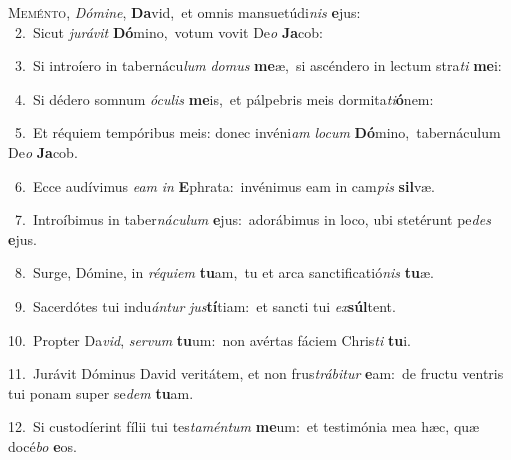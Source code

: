 \lettrine{\initial\textcolor{\initialcolor}{M}}{eménto,} \textit{Dó}\-\textit{mi}\textit{ne}, \textbf{Da}\-vid,~\star et omnis mansuetúdi\textit{nis} \textbf{e}\-jus:\\
{\numbfont\textcolor{\numbcolor}{~2.}}~Sicut \textit{ju}\-\textit{rá}\textit{vit} \textbf{Dó}\-mino,~\star votum vovit De\textit{o} \textbf{Ja}\-cob:\par
{\numbfont\textcolor{\numbcolor}{~3.}}~Si introíero in tabernácu\textit{lum} \textit{do}\-\textit{mus} \textbf{me}\-æ,~\star si ascéndero in lectum stra\textit{ti} \textbf{me}\-i:\par
{\numbfont\textcolor{\numbcolor}{~4.}}~Si dédero somnum \textit{ó}\-\textit{cu}\textit{lis} \textbf{me}\-is,~\star et pálpebris meis dormita\-\textit{ti}\-\textbf{ó}nem:\par
{\numbfont\textcolor{\numbcolor}{~5.}}~Et réquiem tempóribus meis: donec invéni\textit{am} \textit{lo}\-\textit{cum} \textbf{Dó}\-mino,~\star tabernáculum De\textit{o} \textbf{Ja}\-cob.\par
{\numbfont\textcolor{\numbcolor}{~6.}}~Ecce audívimus \textit{e}\-\textit{am} \textit{in} \textbf{E}\-phrata:~\star invénimus eam in cam\textit{pis} \textbf{sil}\-væ.\par
{\numbfont\textcolor{\numbcolor}{~7.}}~Introíbimus in taber\-\textit{ná}\-\textit{cu}\textit{lum} \textbf{e}\-jus:~\star adorábimus in loco, ubi stetérunt pe\textit{des} \textbf{e}\-jus.\par
{\numbfont\textcolor{\numbcolor}{~8.}}~Surge, Dómine, in \textit{ré}\-\textit{qui}\textit{em} \textbf{tu}\-am,~\star tu et arca sanctificatió\textit{nis} \textbf{tu}\-æ.\par
{\numbfont\textcolor{\numbcolor}{~9.}}~Sacerdótes tui indu\-\textit{án}\-\textit{tur} \textit{jus}\-\textbf{tí}tiam:~\star et sancti tui \textit{ex}\-\textbf{súl}tent.\par
{\numbfont\textcolor{\numbcolor}{10.}}~Propter Da\-\textit{vid}\-, \textit{ser}\-\textit{vum} \textbf{tu}\-um:~\star non avértas fáciem Chris\textit{ti} \textbf{tu}\-i.\par
{\numbfont\textcolor{\numbcolor}{11.}}~Jurávit Dóminus David veritátem, et non frus\-\textit{trá}\-\textit{bi}\textit{tur} \textbf{e}\-am:~\star de fructu ventris tui ponam super se\textit{dem} \textbf{tu}\-am.\par
{\numbfont\textcolor{\numbcolor}{12.}}~Si custodíerint fílii tui tes\-\textit{ta}\-\textit{mén}\textit{tum} \textbf{me}\-um:~\star et testimónia mea hæc, quæ docé\textit{bo} \textbf{e}\-os.\par
